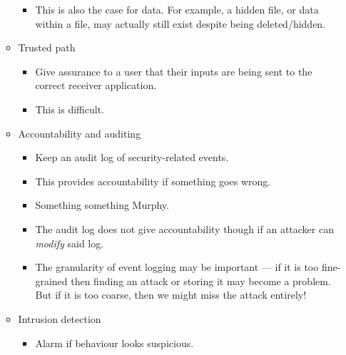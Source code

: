 \documentclass{article}
\begin{document}
\begin{itemize}
\begin{itemize}
\begin{itemize}
                    \item This is also the case for data.  For example, a hidden file, or data within a file, may actually still exist despite being deleted/hidden.
                \end{itemize}
            \item Trusted path
                \begin{itemize}
                    \item Give assurance to a user that their inputs are being sent to the correct receiver application.
                    \item This is difficult.
                \end{itemize}
            \item Accountability and auditing
                \begin{itemize}
                    \item Keep an audit log of security-related events.
                    \item This provides accountability if something goes wrong.
                    \item Something something Murphy.
                    \item The audit log does not give accountability though if an attacker can \emph{modify} said log.
                    \item The granularity of event logging may be important --- if it is too fine-grained then finding an attack or storing it may  become a problem.  But if it is too coarse, then we might miss the attack entirely!
                \end{itemize}
            \item Intrusion detection
                \begin{itemize}
                    \item Alarm if behaviour looks suspicious.
                \end{itemize}
        \end{itemize}
\end{itemize}
\end{document}
